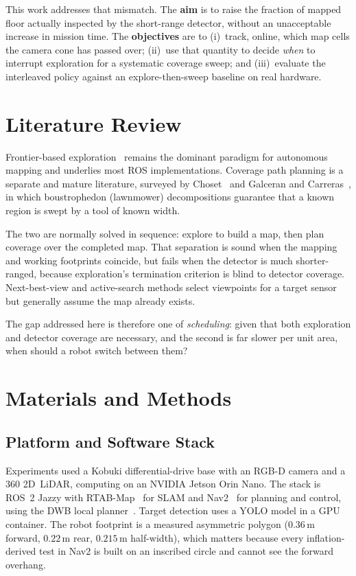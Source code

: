 \documentclass[conference,a4paper,10pt]{IEEEtran}
\begin{document}
This work addresses that mismatch. The \textbf{aim} is to raise the fraction of
mapped floor actually inspected by the short-range detector, without an
unacceptable increase in mission time. The \textbf{objectives} are to (i)~track,
online, which map cells the camera cone has passed over; (ii)~use that quantity
to decide \emph{when} to interrupt exploration for a systematic coverage sweep;
and (iii)~evaluate the interleaved policy against an explore-then-sweep baseline
on real hardware.

\section{Literature Review}
Frontier-based exploration~\cite{yamauchi} remains the dominant paradigm for
autonomous mapping and underlies most ROS implementations. Coverage path
planning is a separate and mature literature, surveyed by
Choset~\cite{choset} and Galceran and Carreras~\cite{galceran}, in which
boustrophedon (lawnmower) decompositions guarantee that a known region is
swept by a tool of known width.

The two are normally solved in sequence: explore to build a map, then plan
coverage over the completed map. That separation is sound when the mapping and
working footprints coincide, but fails when the detector is much
shorter-ranged, because exploration's termination criterion is blind to
detector coverage. Next-best-view and active-search methods select viewpoints
for a target sensor but generally assume the map already exists.

The gap addressed here is therefore one of \emph{scheduling}: given that both
exploration and detector coverage are necessary, and the second is far slower
per unit area, when should a robot switch between them?

\section{Materials and Methods}

\subsection{Platform and Software Stack}
Experiments used a Kobuki differential-drive base with an RGB-D camera and a
360\textdegree{} 2D~LiDAR, computing on an NVIDIA Jetson Orin Nano. The stack is
ROS~2 Jazzy with RTAB-Map~\cite{rtabmap} for SLAM and
Nav2~\cite{nav2} for planning and control, using the DWB local
planner~\cite{dwa}. Target detection uses a YOLO model in a GPU container.
The robot footprint is a measured asymmetric polygon
(\(0.36\,\mathrm{m}\) forward, \(0.22\,\mathrm{m}\) rear,
\(0.215\,\mathrm{m}\) half-width), which matters because every
inflation-derived test in Nav2 is built on an inscribed circle and cannot see
the forward overhang.
\end{document}
